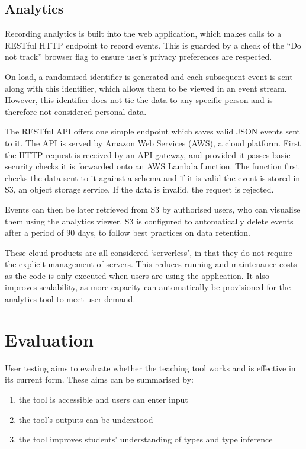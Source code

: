 \documentclass[a4paper,fleqn,oneside,12pt]{report}
\begin{document}
\section{Analytics}\label{id:h.39bhrrv1fi5p}

Recording analytics is built into the web application, which makes calls to a RESTful HTTP endpoint to record events. This is guarded by a check of the ``Do not track'' browser flag to ensure user's privacy preferences are respected.

On load, a randomised identifier is generated and each subsequent event is sent along with this identifier, which allows them to be viewed in an event stream. However, this identifier does not tie the data to any specific person and is therefore not considered personal data.

The RESTful API offers one simple endpoint which saves valid JSON events sent to it. The API is served by Amazon Web Services (AWS), a cloud platform. First the HTTP request is received by an API gateway, and provided it passes basic security checks it is forwarded onto an AWS Lambda function. The function first checks the data sent to it against a schema and if it is valid the event is stored in S3, an object storage service. If the data is invalid, the request is rejected.

Events can then be later retrieved from S3 by authorised users, who can visualise them using the analytics viewer. S3 is configured to automatically delete events after a period of 90 days, to follow best practices on data retention.

These cloud products are all considered `serverless', in that they do not require the explicit management of servers. This reduces running and maintenance costs as the code is only executed when users are using the application. It also improves scalability, as more capacity can automatically be provisioned for the analytics tool to meet user demand.

\chapter{Evaluation}\label{id:h.e6letww4nhn0}

User testing aims to evaluate whether the teaching tool works and is effective in its current form. These aims can be summarised by:
\begin{enumerate}
  \item the tool is accessible and users can enter input
  \item the tool's outputs can be understood
  \item the tool improves students' understanding of types and type inference
\end{enumerate}
\end{document}
